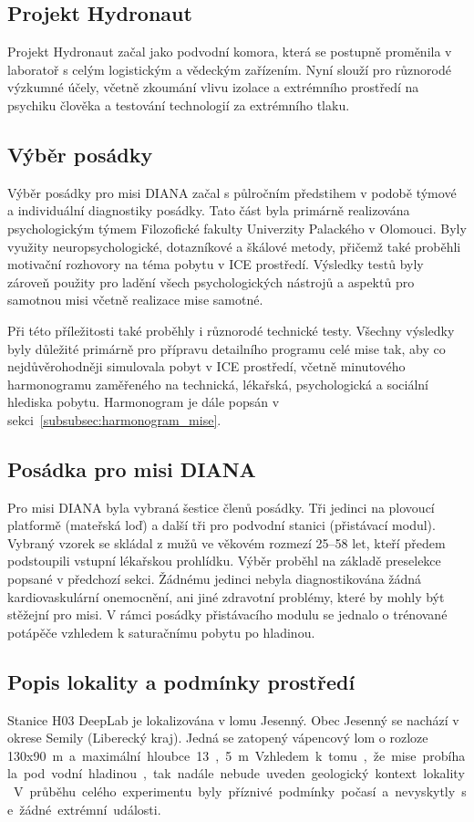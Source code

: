 \subsection{Projekt Hydronaut}
\label{subsec:projekt_hydronaut}
Projekt Hydronaut začal jako podvodní komora, která se postupně proměnila v
laboratoř s celým logistickým a vědeckým zařízením. Nyní slouží pro různorodé
výzkumné účely, včetně zkoumání vlivu izolace a extrémního prostředí na psychiku
člověka a testování technologií za extrémního tlaku.

\subsection{Výběr posádky}
\label{subsec:vyber_posadky}
Výběr posádky pro misi DIANA začal s půlročním předstihem v podobě týmové a
individuální diagnostiky posádky. Tato část byla primárně realizována
psychologickým týmem Filozofické fakulty Univerzity Palackého v Olomouci. Byly
využity neuropsychologické, dotazníkové a škálové metody, přičemž také proběhli
motivační rozhovory na téma pobytu v ICE prostředí. Výsledky testů byly zároveň
použity pro ladění všech psychologických nástrojů a aspektů pro samotnou misi
včetně realizace mise samotné.

Při této příležitosti také proběhly i různorodé technické testy. Všechny
výsledky byly důležité primárně pro přípravu detailního programu celé mise tak,
aby co nejdůvěrohodněji simulovala pobyt v ICE prostředí, včetně minutového
harmonogramu zaměřeného na technická, lékařská, psychologická a sociální
hlediska pobytu. Harmonogram je dále popsán v
sekci~\ref{subsubsec:harmonogram_mise}.

\subsection{Posádka pro misi DIANA}
Pro misi DIANA byla vybraná šestice členů posádky. Tři jedinci na plovoucí
platformě (mateřská loď) a další tři pro podvodní stanici (přistávací modul).
Vybraný vzorek se skládal z mužů ve věkovém rozmezí 25--58 let, kteří předem
podstoupili vstupní lékařskou prohlídku. Výběr proběhl na základě preselekce
popsané v předchozí sekci. Žádnému jedinci nebyla diagnostikována žádná
kardiovaskulární onemocnění, ani jiné zdravotní problémy, které by mohly být
stěžejní pro misi. V rámci posádky přistávacího modulu se jednalo o trénované
potápěče vzhledem k saturačnímu pobytu po hladinou.

\subsection{Popis lokality a podmínky prostředí}
\label{subsec:diana_lokalita}
Stanice H03 DeepLab je lokalizována v lomu Jesenný. Obec Jesenný se nachází v
okrese Semily (Liberecký kraj). Jedná se zatopený vápencový lom o rozloze
130x90~\si\meter~a maximální hloubce 13,5~\si\meter. Vzhledem k tomu, že mise
probíhala pod vodní hladinou, tak nadále nebude uveden geologický kontext
lokality. V průběhu celého experimentu byly příznivé podmínky počasí a
nevyskytly se žádné extrémní události.

